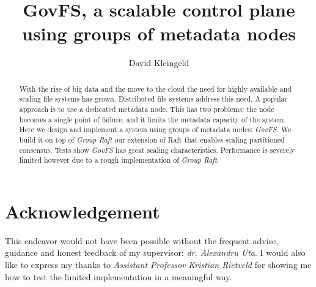 \documentclass[lang=en, hanging-titles=true]{skrapport}
\title{GovFS, a scalable control plane using groups of metadata nodes}
\author[opensource@davidsk.dev]{David Kleingeld}
\begin{document}
\begin{titlepage}
\maketitle

\begin{abstract}
With the rise of big data and the move to the cloud the need for highly available and scaling file systems has grown. Distributed file systems address this need. A popular approach is to use a dedicated metadata node. This has two problems: the node becomes a single point of failure, and it limits the metadata capacity of the system. Here we design and implement a system using groups of metadata nodes: \textit{GovFS}. We build it on top of \textit{Group Raft} our extension of Raft that enables scaling partitioned consensus. Tests show \textit{GovFS} has great scaling characteristics. Performance is severely limited however due to a rough implementation of \textit{Group Raft}.
\end{abstract}
\end{titlepage}

\section*{Acknowledgement}
This endeavor would not have been possible without the frequent advise, guidance and honest feedback of my supervisor: \emph{dr. Alexandru Uta}. 
I would also like to express my thanks to \emph{Assistant Professor Kristian Rietveld} for showing me how to test the limited implementation in a meaningful way.

\tableofcontents
\restoregeometry
\clearpage

\newcommand{\zookeeper}{ZooKeeper}
\newcommand{\raft}{Raft}
\newcommand{\paxos}{Paxos}
\newcommand{\multipaxos}{Multi-Paxos}
\newcommand{\ceph}{Ceph}
\newcommand{\zab}{Zab}
\end{document}
